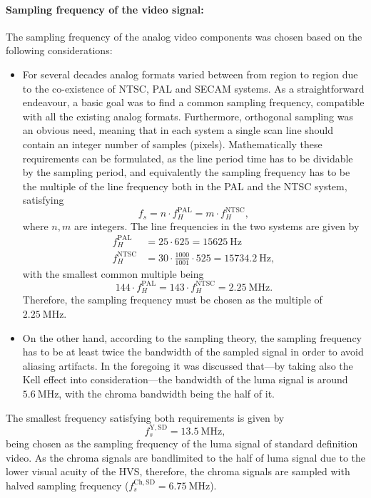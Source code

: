 \paragraph*{Sampling frequency of the video signal:\\}
The sampling frequency of the analog video components was chosen based on the following considerations:
\begin{itemize}
\item For several decades analog formats varied between from region to region due to the co-existence of NTSC, PAL and SECAM systems.
As a straightforward endeavour, a basic goal was to find a common sampling frequency, compatible with all the existing analog formats.
Furthermore, orthogonal sampling was an obvious need, meaning that in each system a single scan line should contain an integer number of samples (pixels).
Mathematically these requirements can be formulated, as the line period time has to be dividable by the sampling period, and equivalently
the sampling frequency has to be the multiple of the line frequency both in the PAL and the NTSC system, satisfying
\begin{equation}
f_s = n \cdot f_H^{\mathrm{PAL}} = m \cdot f_H^{\mathrm{NTSC}},
\end{equation}
%
where $n, m$ are integers.
The line frequencies in the two systems are given by
\begin{align}
f_H^{\mathrm{PAL}} &= 25 \cdot 625 = 15625~\mathrm{Hz} \\
f_H^{\mathrm{NTSC}} &= 30 \cdot \frac{1000}{1001} \cdot 525 = 15734.2~\mathrm{Hz} ,
\end{align}
with the smallest common multiple being
\begin{equation}
144 \cdot f_H^{\mathrm{PAL}} = 143 \cdot f_H^{\mathrm{NTSC}} = 2.25~\mathrm{MHz}.
\end{equation}
Therefore, the sampling frequency must be chosen as the multiple of $2.25~\mathrm{MHz}$.
\item On the other hand, according to the sampling theory, the sampling frequency has to be at least twice the bandwidth of the sampled signal in order to avoid aliasing artifacts.
In the foregoing it was discussed that---by taking also the Kell effect into consideration---the bandwidth of the luma signal is around $5.6~\mathrm{MHz}$, with the chroma bandwidth being the half of it.
\end{itemize}
The smallest frequency satisfying both requirements is given by 
\begin{equation}
f^{\mathrm{Y,SD}}_s = 13.5~\mathrm{MHz},
\end{equation}
being chosen as the sampling frequency of the luma signal of standard definition video.
As the chroma signals are bandlimited to the half of luma signal due to the lower visual acuity of the HVS, therefore, the chroma signals are sampled with halved sampling frequency ($f^{\mathrm{Ch,SD}}_s = 6.75~\mathrm{MHz}$).

